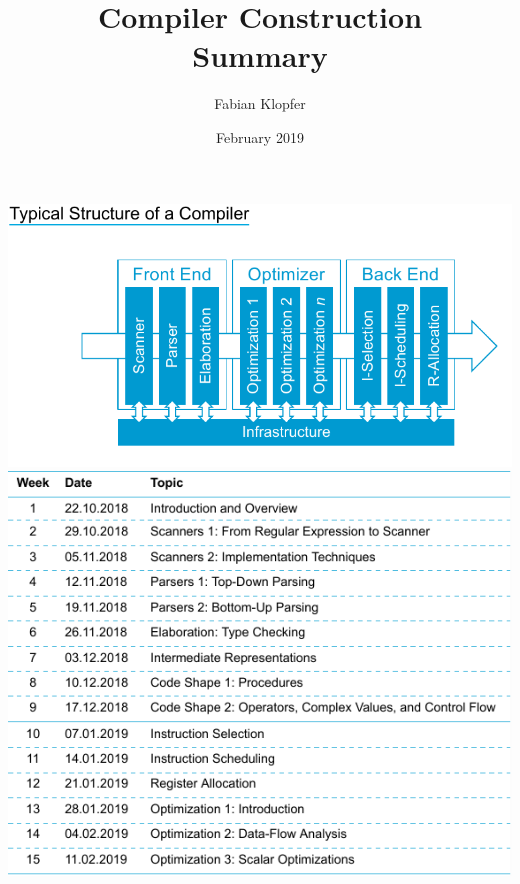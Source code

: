\documentclass[a4paper]{report}
\title{Compiler Construction \\
Summary}
\author{Fabian Klopfer}
\date{February 2019}
\begin{document}


\begin{onecolumn}
\begin{center}
    \includegraphics[width=.8\textwidth,height=0.4\textheight,keepaspectratio]{img/architecture_overview.png} \\
    \includegraphics[width=.8\textwidth,height=0.4\textheight,keepaspectratio]{img/topic_overview.png}\\
\end{center}
\end{onecolumn}

\tableofcontents
\newpage

\begin{twocolumn}



\end{twocolumn}
\end{document}
